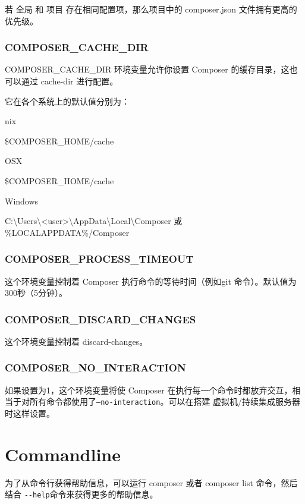若 全局 和 项目 存在相同配置项，那么项目中的 composer.json 文件拥有更高的优先级。

\subsection{COMPOSER\_CACHE\_DIR}

COMPOSER\_CACHE\_DIR 环境变量允许你设置 Composer 的缓存目录，这也可以通过 cache-dir 进行配置。

它在各个系统上的默认值分别为：

\begin{compactitem}
\item *nix

\$COMPOSER\_HOME/cache
\item OSX

\$COMPOSER\_HOME/cache
\item Windows

C:\textbackslash Users\textbackslash <user>\textbackslash AppData\textbackslash Local\textbackslash Composer 或 \%LOCALAPPDATA\%/Composer
\end{compactitem}

\subsection{COMPOSER\_PROCESS\_TIMEOUT}

这个环境变量控制着 Composer 执行命令的等待时间（例如git 命令）。默认值为300秒（5分钟）。

\subsection{COMPOSER\_DISCARD\_CHANGES}

这个环境变量控制着 discard-changes。

\subsection{COMPOSER\_NO\_INTERACTION}

如果设置为1，这个环境变量将使 Composer 在执行每一个命令时都放弃交互，相当于对所有命令都使用了\texttt{--no-interaction}。可以在搭建 虚拟机/持续集成服务器 时这样设置。



\chapter{Commandline}

为了从命令行获得帮助信息，可以运行 composer 或者 composer list 命令，然后结合 \texttt{-\/-help}命令来获得更多的帮助信息。

